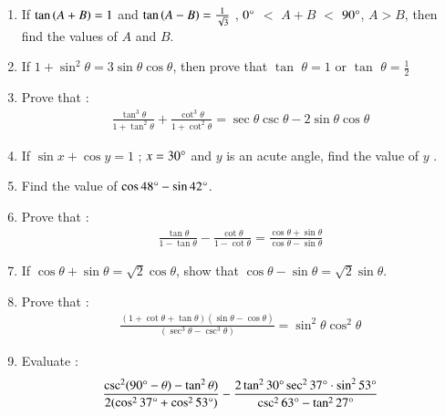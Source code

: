 \begin{enumerate}
\hfill{}\item If $\tan \left(A + B\right) = 1$ and $\tan \left(A - B\right) = \frac{1}{\sqrt{3}}$ , $0\degree$ $<$ $A + B$ $<$ $90\degree$, $A > B$, then find the values of $A$ and $B$.

\hfill{}\item If $1 + \sin^2 \theta  = 3 \sin \theta \cos \theta$, then prove that $\tan$ $\theta = 1 $ or $\tan$ $\theta = \frac{1}{2}$

\hfill{}\item Prove that :
\begin{align*}
\frac{\tan^3 \theta}{1+\tan^2 \theta} + \frac{\cot^3 \theta}{1 + \cot^2 \theta} =  \sec \theta  \csc  \theta - 2 \sin \theta \cos \theta  
\end{align*}


\hfill{}\item If $\sin{x} + \cos{y}= 1$ ; $x=30\degree$  and  $y$ is an acute angle, find the value of $y$ .

\hfill{}\item Find the value of $\cos {48\degree} - \sin {42\degree}$.

\hfill{}\item Prove that :
\begin{align*}
   {\frac{\tan\theta}{1-\tan\theta}} - {\frac{\cot\theta}{1-\cot\theta}}={\frac{\cos\theta+ \sin\theta}{\cos\theta-\sin\theta}}
\end{align*} 

\hfill{}\item If ${\cos\theta + \sin\theta} = {\sqrt 2}{\cos\theta}$, show that ${\cos\theta - \sin\theta} = {\sqrt 2}{\sin\theta}$.

\hfill{}\item Prove that :
\begin{align*}
    {\frac{(1+\cot\theta+\tan\theta)(\sin\theta-\cos\theta)}{(\sec^3\theta-\csc^3\theta)}} = \sin^2\theta \cos^2\theta
\end{align*}

\hfill{}\item Evaluate :
\begin{align*}
    {\frac{\csc^2(90\degree - \theta)-\tan^2\theta)}{2(\cos^2 37\degree + \cos^2 53\degree)}} - {\frac{2\tan^2 30\degree \sec^2 37\degree \cdot \sin^2 53\degree}{\csc^2 63\degree - \tan^2 27\degree}} 
\end{align*}	





\end{enumerate}
